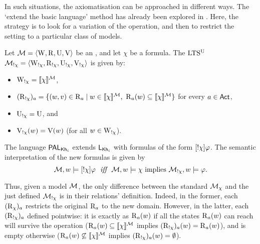 In such situations, the axiomatisation can be approached in different ways. The `extend the basic language' method has already been explored in \cite{Wang2016}. Here, the strategy is to look for a variation of the operation, and then to restrict the setting to a particular class of models.

\medskip

\begin{definition}\label{def:annupdate}\label{def:pakhsyntax}
Let $\mathcal{M} = \langle \operatorname{W}, \operatorname{R}, \operatorname{U}, \operatorname{V} \rangle$ be an \ults, and let $\chi$ be a formula. The $\textup{LTS$^\text{\textup{U}}$}$ $\mathcal{M}_{!\chi} = \langle \operatorname{W}_{!\chi}, \operatorname{R}_{!\chi}, \operatorname{U}_{!\chi}, \operatorname{V}_{!\chi} \rangle$ is given by:
\begin{itemize}
\item $\operatorname{W}_{!\chi} = \llbracket \chi \rrbracket^{\mathcal{M}}$,
\item $(\operatorname{R}_{!\chi})_a = \{ (w,v) \in \operatorname{R}_a \mid w \in \llbracket \chi \rrbracket^{\mathcal{M}} \text{, } \operatorname{R}_a(w) \subseteq \llbracket \chi \rrbracket^{\mathcal{M}} \}$ for every $a \in {\rm \sf Act}$,
\item $\operatorname{U}_{!\chi} = \operatorname{U}$, and 
\item $\operatorname{V}_{!\chi}(w) = \operatorname{V}(w)$ (for all $w\in\operatorname{W}_{!\chi}$).
\end{itemize}
\smallskip
The language $\mathsf{PAL}_{{\sf Kh}_i}$ extends $\mathsf{L}_{{\sf Kh}_i}$ with formulas of the form $[!\chi]\varphi$. The semantic interpretation of the new formulas is given by
\[
	\modults,w \models \gann{\chi}\varphi \ \ \iff \ \ \modults,w \models \chi \mbox{ implies } \annmodelchi,w \models \varphi.
\]
\end{definition}


Thus, given a model $\mathcal{M}$, the only difference between the standard $\mathcal{M}_{\chi}$ and the just defined $\mathcal{M}_{!\chi}$ is in their relations' definition. Indeed, in the former, each $(\operatorname{R}_\chi)_a$ restricts the original $\operatorname{R}_a$ to the new domain. However, in the latter, each $(\operatorname{R}_{!\chi})_a$ defined pointwise: it is exactly as $\operatorname{R}_a(w)$ if all the states $\operatorname{R}_a(w)$ can reach will survive the operation ($\operatorname{R}_a(w) \subseteq \llbracket \chi \rrbracket^{\mathcal{M}}$ implies $(\operatorname{R}_{!\chi})_a(w) = \operatorname{R}_a(w)$), and is empty otherwise ($\operatorname{R}_a(w) \not \subseteq \llbracket \chi \rrbracket^{\mathcal{M}}$ implies $(\operatorname{R}_{!\chi})_a(w) = \emptyset$).

\medskip

